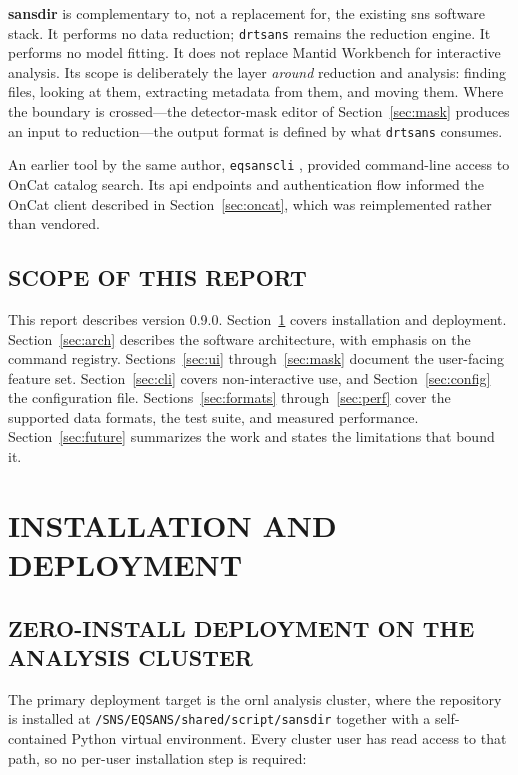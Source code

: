 \documentclass[tm]{ornltm}
\begin{document}
\textbf{sansdir} is complementary to, not a replacement for, the existing
\ac{sns} software stack. It performs no data reduction; \texttt{drtsans} remains
the reduction engine. It performs no model fitting. It does not replace Mantid
Workbench for interactive analysis. Its scope is deliberately the layer
\emph{around} reduction and analysis: finding files, looking at them, extracting
metadata from them, and moving them. Where the boundary is crossed---the
detector-mask editor of Section~\ref{sec:mask} produces an input to
reduction---the output format is defined by what \texttt{drtsans} consumes.

An earlier tool by the same author, \texttt{eqsanscli} \autocite{eqsanscli},
provided command-line access to OnCat catalog search. Its \ac{api} endpoints and
authentication flow informed the OnCat client described in
Section~\ref{sec:oncat}, which was reimplemented rather than vendored.

\subsection{SCOPE OF THIS REPORT}

This report describes version 0.9.0. Section~\ref{sec:install} covers
installation and deployment. Section~\ref{sec:arch} describes the software
architecture, with emphasis on the command registry. Sections~\ref{sec:ui}
through~\ref{sec:mask} document the user-facing feature set. Section~\ref{sec:cli}
covers non-interactive use, and Section~\ref{sec:config} the configuration file.
Sections~\ref{sec:formats} through~\ref{sec:perf} cover the supported data
formats, the test suite, and measured performance. Section~\ref{sec:future}
summarizes the work and states the limitations that bound it.

\section{INSTALLATION AND DEPLOYMENT}
\label{sec:install}

\subsection{ZERO-INSTALL DEPLOYMENT ON THE ANALYSIS CLUSTER}

The primary deployment target is the \ac{ornl} analysis cluster, where the
repository is installed at \texttt{/SNS/EQSANS/shared/script/sansdir} together
with a self-contained Python virtual environment. Every cluster user has read
access to that path, so no per-user installation step is required:
\end{document}
